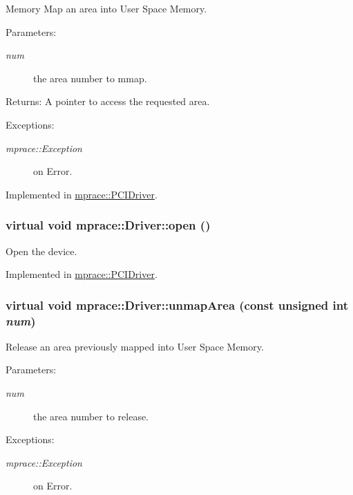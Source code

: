 Memory Map an area into User Space Memory. 

\begin{Desc}
\item[Parameters:]
\begin{description}
\item[{\em num}]the area number to mmap. \end{description}
\end{Desc}
\begin{Desc}
\item[Returns:]A pointer to access the requested area. \end{Desc}
\begin{Desc}
\item[Exceptions:]
\begin{description}
\item[{\em mprace::Exception}]on Error.\end{description}
\end{Desc}


Implemented in \hyperlink{classmprace_1_1PCIDriver_a4}{mprace::PCIDriver}.\hypertarget{classmprace_1_1Driver_a1}{
\subsubsection[open]{\setlength{\rightskip}{0pt plus 5cm}virtual void mprace::Driver::open ()}}
\label{classmprace_1_1Driver_a1}


Open the device. 



Implemented in \hyperlink{classmprace_1_1PCIDriver_a2}{mprace::PCIDriver}.\hypertarget{classmprace_1_1Driver_a4}{
\subsubsection[unmapArea]{\setlength{\rightskip}{0pt plus 5cm}virtual void mprace::Driver::unmap\-Area (const unsigned int {\em num})}}
\label{classmprace_1_1Driver_a4}


Release an area previously mapped into User Space Memory. 

\begin{Desc}
\item[Parameters:]
\begin{description}
\item[{\em num}]the area number to release. \end{description}
\end{Desc}
\begin{Desc}
\item[Exceptions:]
\begin{description}
\item[{\em mprace::Exception}]on Error.\end{description}
\end{Desc}



